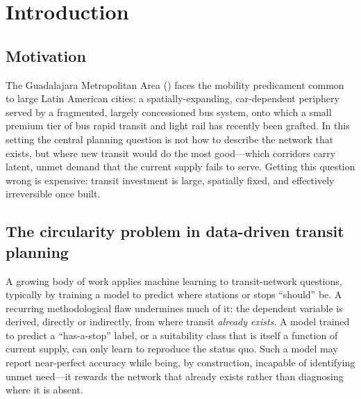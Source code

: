 \chapter{Introduction}
\label{ch:introduction}

\section{Motivation}
\label{sec:intro-motivation}

The Guadalajara Metropolitan Area (\zmg) faces the mobility predicament common to
large Latin American cities: a spatially-expanding, car-dependent periphery served by a
fragmented, largely concessioned bus system, onto which a small premium tier of bus
rapid transit and light rail has recently been grafted. In this setting the central
planning question is not how to describe the network that exists, but where new transit
would do the most good---which corridors carry latent, unmet demand that the current
supply fails to serve. Getting this question wrong is expensive: transit investment is
large, spatially fixed, and effectively irreversible once built.

\section{The circularity problem in data-driven transit planning}
\label{sec:intro-circularity}

A growing body of work applies machine learning to transit-network questions, typically
by training a model to predict where stations or stops ``should'' be. A recurring
methodological flaw undermines much of it: the dependent variable is derived, directly
or indirectly, from where transit \emph{already exists}. A model trained to predict a
``has-a-stop'' label, or a suitability class that is itself a function of current
supply, can only learn to reproduce the status quo. Such a model may report near-perfect
accuracy while being, by construction, incapable of identifying unmet need---it rewards
the network that already exists rather than diagnosing where it is absent.


